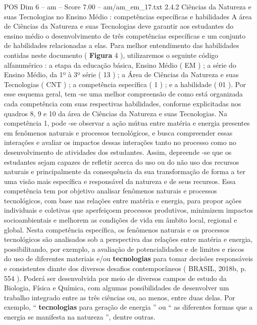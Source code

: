 \begin{textsample}{POS Dim 6 – am – Score 7.00 – am/am\_em\_17.txt}  \label{ex:f6_pos_266}
2.4.2 Ciências da Natureza e suas Tecnologias no Ensino Médio : competências específicas e habilidades A área de Ciências da Natureza e suas Tecnologias deve garantir aos estudantes do ensino médio o desenvolvimento de três competências específicas e um conjunto de habilidades relacionadas a elas.
Para melhor entendimento das habilidades contidas neste documento ( \textbf{Figura} 4 ), utilizaremos o seguinte código alfanumérico : a etapa da educação básica, Ensino Médio ( EM ) ; a série do Ensino Médio, da 1º à 3º série ( 13 ) ; a Área de Ciências da Natureza e suas Tecnologias ( CNT ) ; a competência específica ( 1 ) ; e a habilidade ( 01 ).
Por esse esquema geral, tem -se uma melhor compreensão de como está organizada cada competência com suas respectivas habilidades, conforme explicitadas nos quadros 8, 9 e 10 da área de Ciências da Natureza e suas Tecnologias.
Na competência 1, pode -se observar a ação mútua entre matéria e energia presentes em fenômenos naturais e processos tecnológicos, e busca compreender essas interações e avaliar os impactos dessas interações tanto no processo como no desenvolvimento de atividades dos estudantes.
Assim, depreende -se que os estudantes sejam capazes de refletir acerca do uso ou do não uso dos recursos naturais e principalmente da consequência da sua transformação de forma a ter uma visão mais específica e responsável da natureza e de seus recursos.
Essa competência tem por objetivo analisar fenômenos naturais e processos tecnológicos, com base nas relações entre matéria e energia, para propor ações individuais e coletivas que aperfeiçoem processos produtivos, minimizem impactos socioambientais e melhorem as condições de vida em âmbito local, regional e global.
Nesta competência específica, os fenômenos naturais e os processos tecnológicos são analisados sob a perspectiva das relações entre matéria e energia, possibilitando, por exemplo, a avaliação de potencialidades e de limites e riscos do uso de diferentes materiais e/ou \textbf{tecnologias} para tomar decisões responsáveis e consistentes diante dos diversos desafios contemporâneos ( BRASIL, 2018b, p. 554 ).
Poderá ser desenvolvida por meio de diversos campos de estudo da Biologia, Física e Química, com algumas possibilidades de desenvolver um trabalho integrado entre as três ciências ou, ao menos, entre duas delas.
Por exemplo, “ \textbf{tecnologias} para geração de energia ” ou “ as diferentes formas que a energia se manifesta na natureza ”, dentre outras.

\end{textsample}
